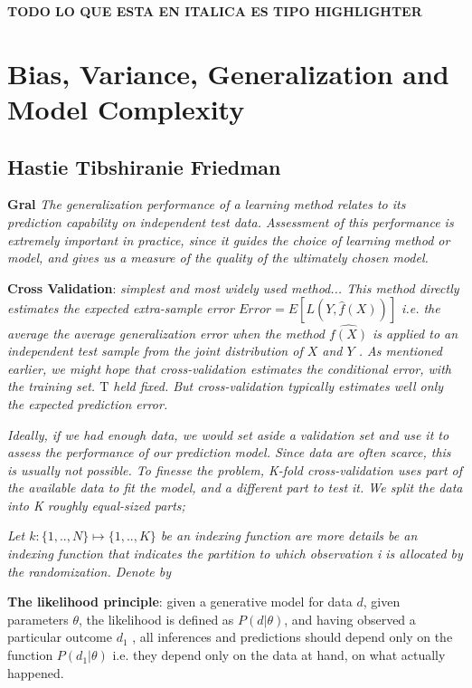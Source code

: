 \textbf{TODO LO QUE ESTA EN ITALICA ES TIPO HIGHLIGHTER}

\section{Bias, Variance, Generalization and Model Complexity}

\subsection{Hastie Tibshiranie Friedman}

\textbf{Gral}
\textit{The generalization performance of a learning method relates to its prediction capability on independent test data. Assessment of this performance is extremely important in practice, since it guides the choice of learning method or model, and gives us a measure of the quality of the ultimately chosen model.}

\textbf{Cross Validation}:  
\textit{simplest and most widely used method... This method directly estimates the expected extra-sample error
$Error = E[L(Y,\hat{f}(X))] $ i.e. the average the average generalization error when the method $\hat{f(X)}$ is applied to an independent test sample from the joint distribution of $X$ and $Y$ . As mentioned earlier, we might hope that cross-validation estimates the conditional error, with the training set. $\mathrm{T}$ held fixed. But cross-validation typically estimates well only the expected prediction error.}

\textit{Ideally, if we had enough data, we would set aside a validation set and use it to assess the performance of our prediction model. Since data are often scarce, this is usually not possible. To finesse the problem, K-fold cross-validation uses part of the available data to fit the model, and a different part to test it. We split the data into K roughly equal-sized parts; }

\textit{Let $k : \{1,..,N\} \mapsto \{1, .., K\}$ be an indexing function are more details be an indexing
function that indicates the partition to which observation i is allocated by the randomization. Denote by}

\textit{}

\textit{}


\textbf{The likelihood principle}: given a generative model for data $d$, given parameters $\theta$, the likelihood is defined as $P (d | \theta)$, and having observed a particular outcome $d_1$ , all inferences and predictions should depend only on the function $P(d_1 | \theta)$ i.e. they depend only on the data at hand, on what actually happened. 

